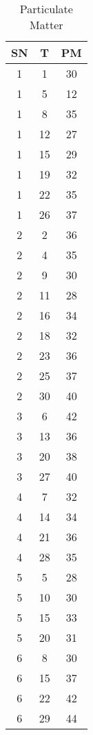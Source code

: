\documentclass{exam}
\begin{document}
\newpage
\begin{table}
    \centering
    \caption{Particulate Matter}
    \begin{tabular}{|ccc|}
        \hline
        SN & T  & PM \\\hline
        1  & 1  & 30 \\
        1  & 5  & 12 \\
        1  & 8  & 35 \\
        1  & 12 & 27 \\
        1  & 15 & 29 \\
        1  & 19 & 32 \\
        1  & 22 & 35 \\
        1  & 26 & 37 \\
        2  & 2  & 36 \\
        2  & 4  & 35 \\
        2  & 9  & 30 \\
        2  & 11 & 28 \\
        2  & 16 & 34 \\
        2  & 18 & 32 \\
        2  & 23 & 36 \\
        2  & 25 & 37 \\
        2  & 30 & 40 \\
        3  & 6  & 42 \\
        3  & 13 & 36 \\
        3  & 20 & 38 \\
        3  & 27 & 40 \\
        4  & 7  & 32 \\
        4  & 14 & 34 \\
        4  & 21 & 36 \\
        4  & 28 & 35 \\
        5  & 5  & 28 \\
        5  & 10 & 30 \\
        5  & 15 & 33 \\
        5  & 20 & 31 \\
        6  & 8  & 30 \\
        6  & 15 & 37 \\
        6  & 22 & 42 \\
        6  & 29 & 44 \\\hline
    \end{tabular}
\end{table}
\end{document}
